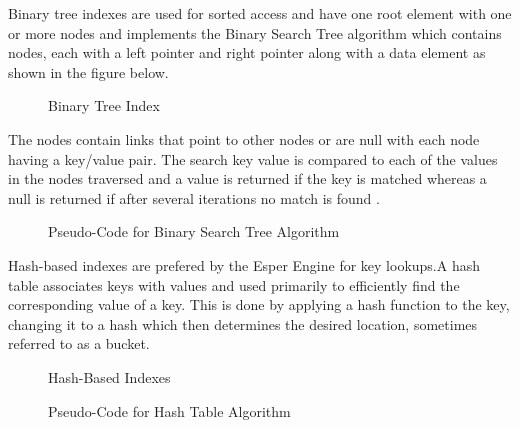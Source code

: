 \noindent  Binary tree indexes are used for sorted access and have one root element with one or more nodes and implements  the Binary Search Tree algorithm which contains nodes, each with a left pointer and right pointer along with a data element as shown in the figure below.

\begin{center}
\begin{figure}[h]
\caption{Binary Tree Index\cite{twentyeight}}

\end{figure}
\end{center}

\noindent The nodes contain links that point to other nodes or are null with each node having a key/value pair. The search key value is compared to each of the values in the nodes traversed and a value is returned if the key is matched whereas  a null is returned if after several iterations no match is found \cite{twentyeight}.
\newpage

\begin{center}
\begin{figure}[h]
\caption{Pseudo-Code for Binary Search Tree Algorithm \cite{thirty}}

\end{figure}
\end{center}

\noindent Hash-based indexes are prefered by the Esper Engine for key lookups.A hash table \cite{twentyeight} associates keys with values and used primarily to efficiently find the corresponding value of a key. This is done by applying a hash function to the key, changing it to a hash which then determines the desired location, sometimes referred to as a bucket.
\newpage
\begin{center}
\begin{figure}[h]
\caption{Hash-Based Indexes\cite{twentyeight}}

\end{figure}
\end{center}

\begin{center}
\begin{figure}[h]
\caption{Pseudo-Code for Hash Table Algorithm \cite{thirtyone}}

\end{figure}
\end{center}
\newpage

